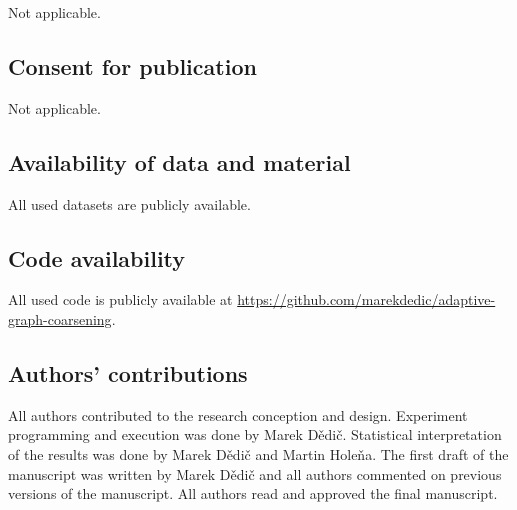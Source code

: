 \documentclass[sn-mathphys,pdflatex,iicol]{sn-jnl}%
\begin{document}
Not applicable.

\subsection*{Consent for publication}

Not applicable.

\subsection*{Availability of data and material}

All used datasets are publicly available.

\subsection*{Code availability}

All used code is publicly available at \href{https://github.com/marekdedic/adaptive-graph-coarsening}{https://github.com/marekdedic/adaptive-graph-coarsening}.

\subsection*{Authors' contributions}

All authors contributed to the research conception and design. Experiment programming and execution was done by Marek Dědič. Statistical interpretation of the results was done by Marek Dědič and Martin Holeňa. The first draft of the manuscript was written by Marek Dědič and all authors commented on previous versions of the manuscript. All authors read and approved the final manuscript.


\end{document}
